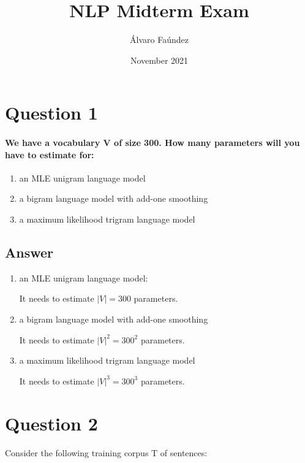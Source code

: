 \documentclass{article}
\title{NLP Midterm Exam}
\author{Álvaro Faúndez}
\date{November 2021}
\begin{document}
\maketitle

\section*{Question 1}

\paragraph{We have a vocabulary V of size 300. How many parameters will you have to estimate for:}

\begin{enumerate}
    \item an MLE unigram language model
    \item a bigram language model with add-one smoothing
    \item a maximum likelihood trigram language model
\end{enumerate}

\subsection*{Answer}

\begin{enumerate}
    \item an MLE unigram language model:

        It needs to estimate $|V| = 300$ parameters.

    \item a bigram language model with add-one smoothing
    
        It needs to estimate $|V|^2 = 300^2$ parameters.

    \item a maximum likelihood trigram language model
    
        It needs to estimate $|V|^3 = 300^3$ parameters.

\end{enumerate}

\clearpage

\section*{Question 2}

\paragraph{} Consider the following training corpus T of sentences:
\end{document}
